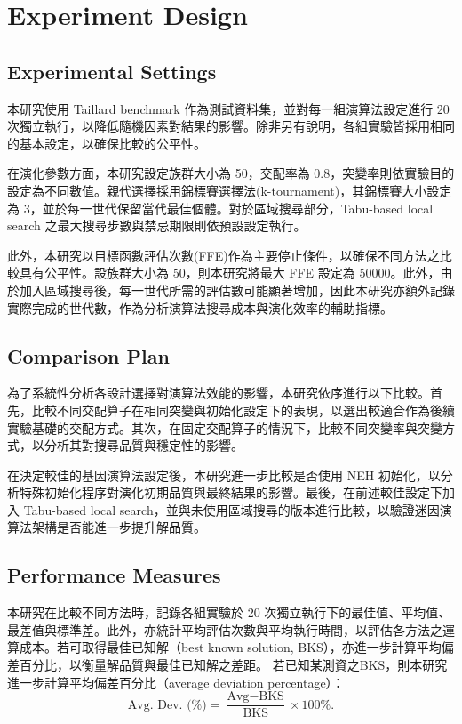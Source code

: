 \documentclass[conference]{IEEEtran}
\begin{document}
\section{Experiment Design}
\fontsize{10pt}{12pt}\selectfont

\subsection{Experimental Settings}

本研究使用 Taillard benchmark 作為測試資料集，並對每一組演算法設定進行 20 次獨立執行，以降低隨機因素對結果的影響。除非另有說明，各組實驗皆採用相同的基本設定，以確保比較的公平性。

在演化參數方面，本研究設定族群大小為 50，交配率為 0.8，突變率則依實驗目的設定為不同數值。親代選擇採用錦標賽選擇法(k-tournament)，其錦標賽大小設定為 3，並於每一世代保留當代最佳個體。對於區域搜尋部分，Tabu-based local search 之最大搜尋步數與禁忌期限則依預設設定執行。

此外，本研究以目標函數評估次數(FFE)作為主要停止條件，以確保不同方法之比較具有公平性。設族群大小為 50，則本研究將最大 FFE 設定為 50000。此外，由於加入區域搜尋後，每一世代所需的評估數可能顯著增加，因此本研究亦額外記錄實際完成的世代數，作為分析演算法搜尋成本與演化效率的輔助指標。
\subsection{Comparison Plan}

為了系統性分析各設計選擇對演算法效能的影響，本研究依序進行以下比較。首先，比較不同交配算子在相同突變與初始化設定下的表現，以選出較適合作為後續實驗基礎的交配方式。其次，在固定交配算子的情況下，比較不同突變率與突變方式，以分析其對搜尋品質與穩定性的影響。

在決定較佳的基因演算法設定後，本研究進一步比較是否使用 NEH 初始化，以分析特殊初始化程序對演化初期品質與最終結果的影響。最後，在前述較佳設定下加入 Tabu-based local search，並與未使用區域搜尋的版本進行比較，以驗證迷因演算法架構是否能進一步提升解品質。

\subsection{Performance Measures}

本研究在比較不同方法時，記錄各組實驗於 20 次獨立執行下的最佳值、平均值、最差值與標準差。此外，亦統計平均評估次數與平均執行時間，以評估各方法之運算成本。若可取得最佳已知解（best known solution, BKS），亦進一步計算平均偏差百分比，以衡量解品質與最佳已知解之差距。
若已知某測資之BKS，則本研究進一步計算平均偏差百分比（average deviation percentage）：
\[\text{Avg. Dev. (\%)} = \frac{\text{Avg} - \text{BKS}}{\text{BKS}} \times 100\%.\]\par
\end{document}
